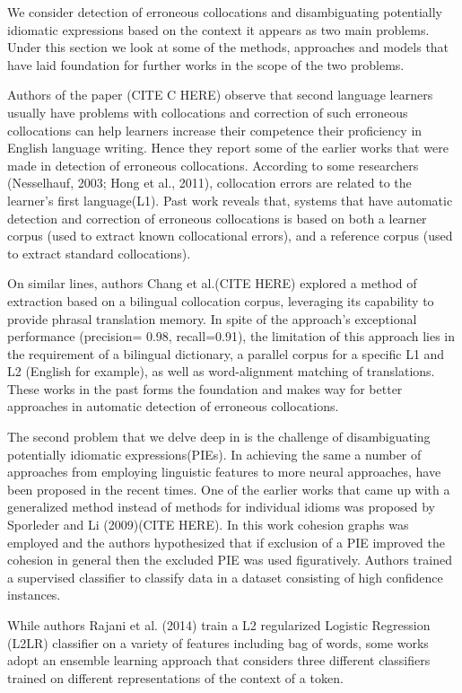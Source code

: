 \documentclass[11pt,a4paper]{article}
\begin{document}
We consider detection of erroneous collocations and disambiguating potentially idiomatic expressions based on the context it appears as two main problems. Under this section we look at some of the methods, approaches and models that have laid foundation for further works in the scope of the two problems. 

Authors of the paper (CITE C HERE) observe that second language learners usually have problems with collocations and correction of such erroneous collocations can help learners increase their competence their proficiency in English language writing. Hence they report some of the earlier works that were made in detection of erroneous collocations. 
According to some researchers (Nesselhauf, 2003; Hong et al., 2011), collocation errors are related to the learner's first language(L1). Past work reveals that, systems that have automatic detection and correction of erroneous collocations is based on both a learner corpus (used to extract known collocational errors), 
and a reference corpus (used to extract standard collocations). 

On similar lines, authors Chang et al.(CITE HERE) explored a method of extraction based on a bilingual collocation corpus, leveraging its capability to provide phrasal translation memory. In spite of the approach's exceptional performance (precision= 0.98, recall=0.91), 
the limitation of this approach lies in the requirement of a bilingual dictionary, a parallel corpus for a specific L1 and  L2 (English for example), as well as word-alignment matching of translations. These works in the past forms the foundation and makes way for better approaches in automatic detection of erroneous collocations.

The second problem that we delve deep in is the challenge of disambiguating potentially idiomatic expressions(PIEs). In achieving the same a number of approaches from employing linguistic features to more neural approaches, have been proposed in the recent times. One of the earlier works that came up with a generalized method instead of methods for individual idioms was proposed by Sporleder and Li (2009)(CITE HERE). 
In this work cohesion graphs was employed and the authors hypothesized that if exclusion of a PIE improved the cohesion in general then the excluded PIE was used figuratively. Authors trained a supervised classifier to classify data in a dataset consisting of high confidence instances. 

While authors Rajani et al. (2014) train a L2 regularized Logistic Regression (L2LR) classifier on a variety of features including bag of words, some works adopt an ensemble learning approach that considers three different classifiers trained on different representations of the context of a token. 
\end{document}
